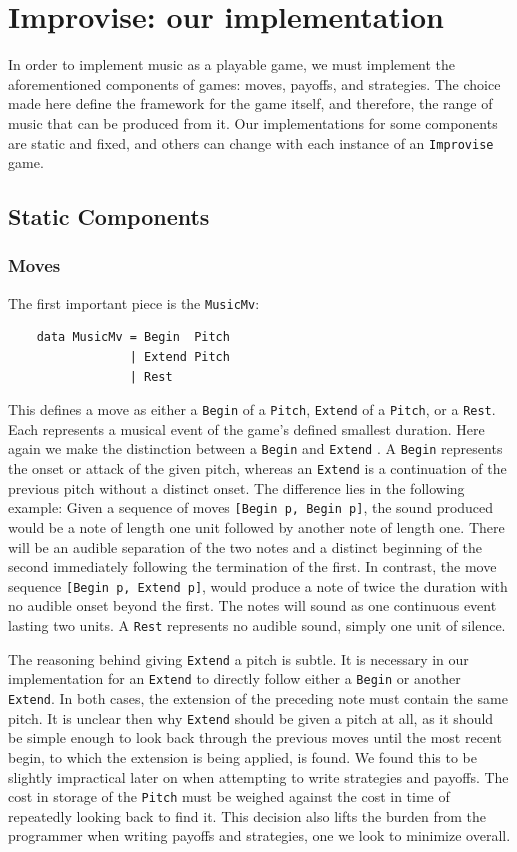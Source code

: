 \documentclass{article}
\begin{document}
\section{Improvise: our
implementation}

In order to implement music as a playable game, we must implement the
aforementioned components of games: moves, payoffs, and strategies. The
choice made here define the framework for the game itself, and
therefore, the range of music that can be produced from it.  Our 
implementations for some components are static and fixed, and others 
can change with each instance of an \texttt{Improvise} game.

\subsection{Static Components}
\subsubsection{Moves}
The first important piece is the \texttt{MusicMv}:

\begin{verbatim}
    data MusicMv = Begin  Pitch
                 | Extend Pitch
                 | Rest
\end{verbatim}

This defines a move as either a \texttt{Begin} of a \texttt{Pitch},
\texttt{Extend} of a \texttt{Pitch}, or a \texttt{Rest}. Each represents
a musical event of the game's defined smallest duration. Here again we make
the distinction between a \texttt{Begin} and \texttt{Extend} . A
\texttt{Begin} represents the onset or attack of the given pitch,
whereas an \texttt{Extend} is a continuation of the previous pitch
without a distinct onset. The difference lies in the following example:
Given a sequence of moves \texttt{{[}Begin p, Begin p{]}}, the sound
produced would be a note of length one unit followed by another note of
length one. There will be an audible separation of the two notes and a
distinct beginning of the second immediately following the termination
of the first. In contrast, the move sequence
\texttt{{[}Begin p, Extend p{]}}, would produce a note of twice the
duration with no audible onset beyond the first. The notes will sound as
one continuous event lasting two units. A \texttt{Rest} represents no
audible sound, simply one unit of silence.

The reasoning behind giving \texttt{Extend} a pitch is subtle. It is
necessary in our implementation for an \texttt{Extend} to directly
follow either a \texttt{Begin} or another \texttt{Extend}. In both
cases, the extension of the preceding note must contain the same pitch.
It is unclear then why \texttt{Extend} should be given a pitch at all,
as it should be simple enough to look back through the previous moves
until the most recent begin, to which the extension is being applied, is
found. We found this to be slightly impractical later on when attempting
to write strategies and payoffs. The cost in storage of the
\texttt{Pitch} must be weighed against the cost in time of repeatedly
looking back to find it. This decision also lifts the burden from the
programmer when writing payoffs and strategies, one we look to minimize
overall.
\end{document}
